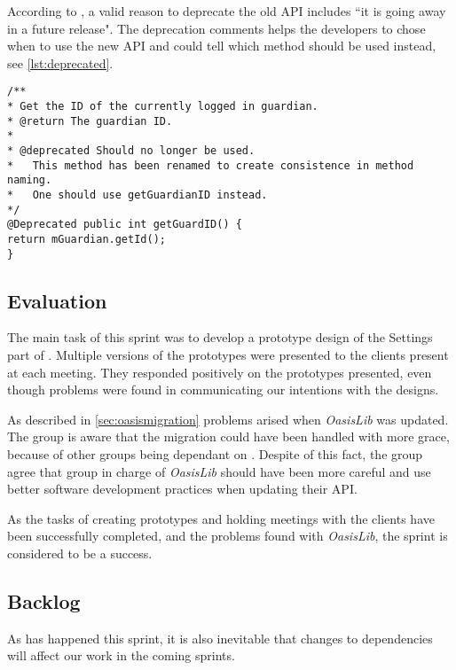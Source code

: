According to \citet{deprecatedreference}, a valid reason to deprecate the old API includes ``it is going away in a future release". The deprecation comments helps the developers to chose when to use the new API and could tell which method should be used instead, see \cref{lst:deprecated}.

\begin{lstlisting}[caption={Example of a deprecated method could look like this.}, label={lst:deprecated}]
/**
* Get the ID of the currently logged in guardian.
* @return The guardian ID.
* 
* @deprecated Should no longer be used.
* 	This method has been renamed to create consistence in method naming.
*	One should use getGuardianID instead.
*/
@Deprecated public int getGuardID() {
return mGuardian.getId();
}
\end{lstlisting}

\subsection{Evaluation}
The main task of this sprint was to develop a prototype design of the Settings part of \launcher.
Multiple versions of the prototypes were presented to the clients present at each meeting.
They responded positively on the prototypes presented, even though problems were found in communicating our intentions with the designs.

As described in \cref{sec:oasismigration} problems arised when \textit{OasisLib} was updated.
The group is aware that the migration could have been handled with more grace, because of other groups being dependant on \launcher.
Despite of this fact, the group agree that group in charge of \textit{OasisLib} should have been more careful and use better software development practices when updating their API.

As the tasks of creating prototypes and holding meetings with the clients have been successfully completed, and the problems found with \textit{OasisLib}, the sprint is considered to be a success.

\subsection{Backlog}\label{sec:sprint2:backlog}


As has happened this sprint, it is also inevitable that changes to dependencies will affect our work in the coming sprints.